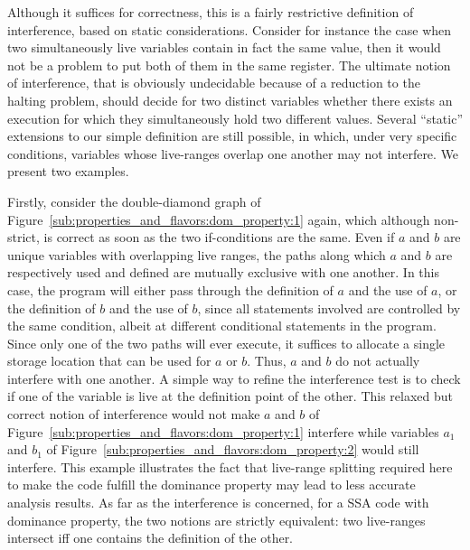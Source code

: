 Although it suffices
for correctness, this is a fairly restrictive definition of interference, based on static considerations. Consider for instance the case when two simultaneously live variables contain in fact the same value, then it would not be a problem to put both of them in the same register.
The ultimate notion of interference, that is obviously undecidable because of a reduction to the halting problem, should decide for two distinct variables whether there exists an execution for which they simultaneously hold two different values. 
Several ``static'' extensions to our simple definition are still possible, in which,
under very specific conditions, variables whose live-ranges overlap
one another may not interfere. 
We present two examples.

Firstly, consider the double-diamond graph of Figure~\ref{sub:properties_and_flavors:dom_property:1} again, which although non-strict, is correct as soon as the two if-conditions are the same.
Even if $a$ and $b$ are unique variables with overlapping live
ranges, the paths along which $a$ and $b$ are respectively used and
defined are mutually exclusive with one another. In this case, the
program will either pass through the definition of $a$ and the use
of $a$, or the definition of $b$ and the use of $b$, since all
statements involved are controlled by the same condition, albeit
at different conditional statements in the program. Since only
one of the two paths will ever execute, it suffices to allocate a 
single storage location that can be used for $a$ or $b$. Thus, $a$
and $b$ do not actually interfere with one another. A simple way to refine the interference test is to 
check if one of the variable is live at the definition point of the other. 
This relaxed but correct notion of interference would not make $a$ and $b$ of Figure~\ref{sub:properties_and_flavors:dom_property:1} interfere while variables $a_1$ and $b_1$ of Figure~\ref{sub:properties_and_flavors:dom_property:2} would still interfere. This example illustrates the fact that live-range splitting required here to make the code fulfill the dominance property may lead to less accurate analysis results.
As far as the interference is concerned, for a SSA code with dominance property, the two notions are strictly equivalent: two live-ranges intersect iff one contains the definition of the other.

